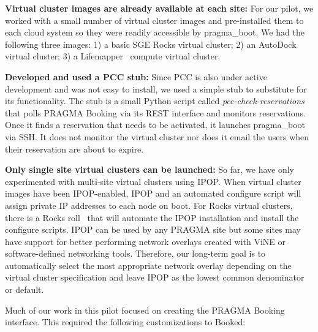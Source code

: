 \documentclass{acm_proc_article-sp}
\begin{document}
\textbf{Virtual cluster images are already available at each site:}  For our pilot, we worked with a small number of virtual cluster images and pre-installed them to each cloud system so they were readily accessible by pragma\_boot.  We had the following three images: 1) a basic SGE Rocks virtual cluster; 2) an AutoDock virtual cluster;  3) a Lifemapper~\cite{lifemapper} compute virtual cluster.   

\textbf{Developed and used a PCC stub:}  Since PCC is also under active development and was not easy to install, we used a simple stub to substitute for its functionality.  The stub is a small Python script called \textit{pcc-check-reservations} that polls PRAGMA Booking via its REST interface and monitors reservations.  Once it finds a reservation that needs to be activated, it launches pragma\_boot via SSH.  It does not  monitor the virtual cluster nor does it email the users when their reservation are about to expire.  

\textbf{Only single site virtual clusters can be launched:}  So far, we have only experimented with multi-site virtual clusters using IPOP.  When virtual cluster images have been IPOP-enabled, IPOP and an automated configure script will assign private IP addresses to each node on boot.  For Rocks virtual clusters, there is a Rocks roll~\cite{ipoproll} that will automate the IPOP installation and install the configure scripts.  IPOP can be used by any PRAGMA site but some sites may have support for better performing network overlays created with ViNE or software-defined networking tools.  Therefore, our long-term goal is to automatically select the most appropriate network overlay depending on the virtual cluster specification and leave IPOP as the lowest common denominator or default.

Much of our work in this pilot focused on creating the PRAGMA Booking interface.  This required the following customizations to Booked:
\end{document}
